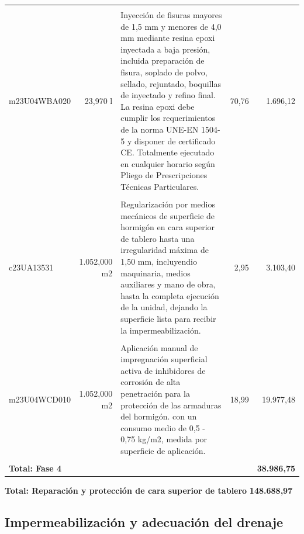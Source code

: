 \documentclass{book}%
\begin{document}
\begin{longtable}{lrlrr}
&&&&\\%
m23U04WBA020&    23,970 l&\multicolumn{1}{p{5cm}}{Inyección de fisuras mayores de 1,5 mm y menores de 4,0 mm mediante resina epoxi inyectada a baja presión, incluida preparación de fisura, soplado de polvo, sellado, rejuntado, boquillas de inyectado y refino final. La resina epoxi debe cumplir los requerimientos de la norma UNE{-}EN 1504{-}5 y disponer de certificado CE. Totalmente ejecutado en cualquier horario según Pliego de Prescripciones Técnicas Particulares.}&     70,76&1.696,12\\%
&&&&\\%
c23UA13531& 1.052,000 m2&\multicolumn{1}{p{5cm}}{Regularización por medios mecánicos de superficie de hormigón en cara superior de tablero hasta una irregularidad máxima de 1,50 mm, incluyendio maquinaria, medios auxiliares y mano de obra, hasta la completa ejecución de la unidad, dejando la superficie lista para recibir la impermeabilización.}&      2,95&3.103,40\\%
&&&&\\%
m23U04WCD010& 1.052,000 m2&\multicolumn{1}{p{5cm}}{Aplicación manual de impregnación superficial activa de inhibidores de corrosión de alta penetración para la protección de las armaduras del hormigón. con un consumo medio de 0,5 {-} 0,75 kg/m2, medida por superficie de aplicación.}&     18,99&19.977,48\\%
&&&&\\%
\multicolumn{4}{p{8cm}}{\textbf{Total: Fase 4}}&\textbf{38.986,75}\\%
\end{longtable}%
\normalsize

%
\noindent%
\large%
\textbf{Total: Reparación y protección de cara superior de tablero }%
\dotfill%
\textbf{148.688,97}%
\newline%
\normalsize

%
\subsection{Impermeabilización y adecuación del drenaje}%
\end{document}

